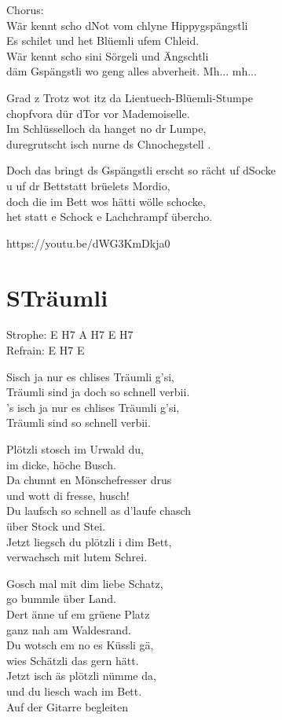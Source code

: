 \documentclass[
  letterpaper,
]{scrbook}
\begin{document}
Chorus:\\
Wär kennt scho d\textquotesingle Not vom chlyne Hippygspängstli\\
Es schilet und het Blüemli ufem Chleid.\\
Wär kennt scho sini Sörgeli und Ängschtli\\
däm Gspängstli wo geng alles abverheit. Mh... mh...

Grad z Trotz wot itz da Lientuech-Blüemli-Stumpe\\
chopfvora dür d\textquotesingle Tor vor Mademoiselle.\\
Im Schlüsselloch da hanget no dr Lumpe,\\
duregrutscht isch nurne ds Chnochegstell .

Doch das bringt ds Gspängstli erscht so rächt uf
d\textquotesingle Socke\\
u uf dr Bettstatt brüelet\textquotesingle s Mordio,\\
doch die im Bett wo\textquotesingle s hätti wölle schocke,\\
het statt e Schock e Lachchrampf übercho.

https://youtu.be/dWG3KmDkja0

\hypertarget{struxe4umli}{%
\chapter{S\textquotesingle Träumli}\label{struxe4umli}}

Strophe: E H7 A H7 E H7\\
Refrain: E H7 E

S\textquotesingle isch ja nur es chlises Träumli g'si,\\
Träumli sind ja doch so schnell verbii.\\
's isch ja nur es chlises Träumli g'si,\\
Träumli sind so schnell verbii.

Plötzli stosch im Urwald du,\\
im dicke, höche Busch.\\
Da chunnt en Mönschefresser drus\\
und wott di fresse, husch!\\
Du laufsch so schnell as d'laufe chasch\\
über Stock und Stei.\\
Jetzt liegsch du plötzli i dim Bett,\\
verwachsch mit lutem Schrei.

Gosch mal mit dim liebe Schatz,\\
go bummle über Land.\\
Dert änne uf em grüene Platz\\
ganz nah am Waldesrand.\\
Du wotsch em no es Küssli gä,\\
wies Schätzli das gern hätt.\\
Jetzt isch äs plötzli nümme da,\\
und du liesch wach im Bett.\\
Auf der Gitarre begleiten
\end{document}
